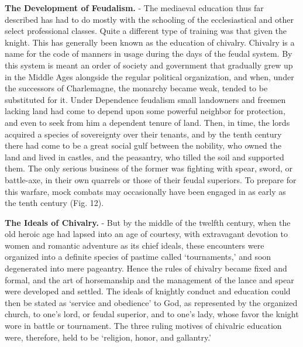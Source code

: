 \documentclass[]{book}
\begin{document}
\textbf{The Development of Feudalism.} - The mediaeval education thus far described has had to do mostly with the schooling of the ecclesiastical and other select professional classes. Quite a different type of training was that given the knight. This has generally been known as the education of chivalry. Chivalry is a name for the code of manners in usage during the days of the feudal system. By this system is meant an order of society and government that gradually grew up in the Middle Ages alongside the regular political organization, and when, under the successors of Charlemagne, the monarchy became weak, tended to be substituted for it. Under Dependence feudalism small landowners and freemen lacking land had come to depend upon some powerful neighbor for protection, and even to seek from him a dependent tenure of land. Then, in time, the lords acquired a species of sovereignty over their tenants, and by the tenth century there had come to be a great social gulf between the nobility, who owned the land and lived in castles, and the peasantry, who tilled the soil and supported them. The only serious business of the former was fighting with spear, sword, or battle-axe, in their own quarrels or those of their feudal superiors. To prepare for this warfare, mock combats may occasionally have been engaged in as early as the tenth century (Fig. 12).

\textbf{The Ideals of Chivalry.} - But by the middle of the twelfth century, when the old heroic age had lapsed into an age of courtesy, with extravagant devotion to women and romantic adventure as its chief ideals, these encounters were organized into a definite species of pastime called `tournaments,' and soon degenerated into mere pageantry. Hence the rules of chivalry became fixed and formal, and the art of horsemanship and the management of the lance and spear were developed and settled. The ideals of knightly conduct and education could then be stated as `service and obedience' to God, as represented by the organized church, to one's lord, or feudal superior, and to one's lady, whose favor the knight wore in battle or tournament. The three ruling motives of chivalric education were, therefore, held to be `religion, honor, and gallantry.'
\end{document}
